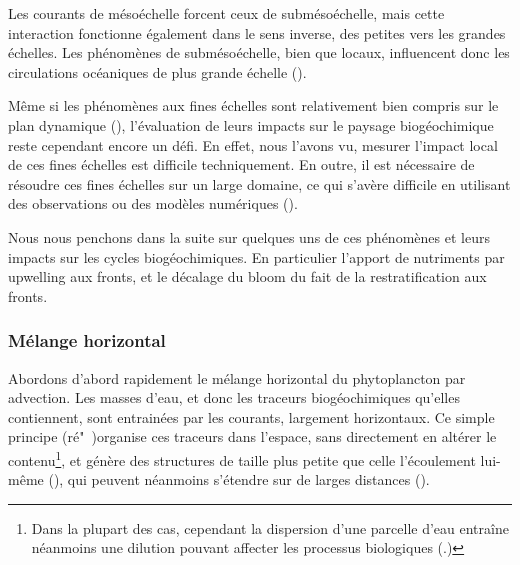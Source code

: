 Les courants de mésoéchelle forcent ceux de submésoéchelle, mais cette interaction fonctionne également dans le sens inverse, des petites vers les grandes échelles.
Les phénomènes de submésoéchelle, bien que locaux, influencent donc les circulations océaniques de plus grande échelle (\cite{sasaki_2020,balwada_2022,naveiragarabato_2022,taylor_2023}).


Même si les phénomènes aux fines échelles sont relativement bien compris sur le plan dynamique (\cite{mcwilliams_2016,mcwilliams_2019,gula_2022,taylor_2023}), l'évaluation de leurs impacts sur le paysage biogéochimique reste cependant encore un défi.
En effet, nous l'avons vu, mesurer l'impact local de ces fines échelles est difficile techniquement.
En outre, il est nécessaire  de résoudre ces fines échelles sur un large domaine, ce qui s'avère difficile en utilisant des observations ou des modèles numériques (\cite{fox-kemper_2019,levy_2023}).

Nous nous penchons dans la suite sur quelques uns de ces phénomènes et leurs impacts sur les cycles biogéochimiques.
En particulier l'apport de nutriments par upwelling aux fronts, et le décalage du bloom du fait de la restratification aux fronts.

\subsubsection{Mélange horizontal}

Abordons d'abord rapidement le mélange horizontal du phytoplancton par advection.
Les masses  d'eau, et donc les traceurs biogéochimiques qu'elles contiennent, sont entrainées par les courants, largement horizontaux.
Ce simple principe (ré"~)organise ces traceurs dans l'espace, sans directement en altérer le contenu\footnote{%
  Dans la plupart des cas, cependant la dispersion d'une parcelle d'eau entraîne néanmoins une dilution pouvant affecter les processus biologiques (\cite{lehahn_2017}.)
}, et génère des structures de taille plus petite que celle l'écoulement lui-même  (\cite{abraham_1998,lehahn_2007,dovidio_2010,levy_2018,lehahn_2018}), qui peuvent néanmoins s'étendre sur de larges distances (\cite{sergi_2020}).


